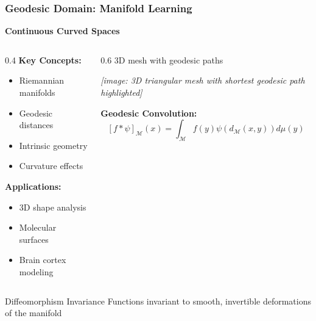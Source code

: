\begin{frame}[fragile]\frametitle{Geodesic Domain: Manifold Learning}

\begin{center}
\textbf{Continuous Curved Spaces}
\end{center}

\begin{columns}
\begin{column}{0.4\textwidth}
\textbf{Key Concepts:}
\begin{itemize}
\item Riemannian manifolds
\item Geodesic distances
\item Intrinsic geometry
\item Curvature effects
\end{itemize}


\textbf{Applications:}
\begin{itemize}
\item 3D shape analysis
\item Molecular surfaces
\item Brain cortex modeling
\end{itemize}
\end{column}
\begin{column}{0.6\textwidth}
{\small 3D mesh with geodesic paths}

\begin{center}
\textit{[image: 3D triangular mesh with shortest geodesic path highlighted]}
\end{center}

\textbf{Geodesic Convolution:}
$$[f * \psi]_{\mathcal{M}}(x) = \int_{\mathcal{M}} f(y) \psi(d_{\mathcal{M}}(x,y)) d\mu(y)$$

\end{column}
\end{columns}

\begin{block}{Diffeomorphism Invariance}
Functions invariant to smooth, invertible deformations of the manifold
\end{block}

\end{frame}

